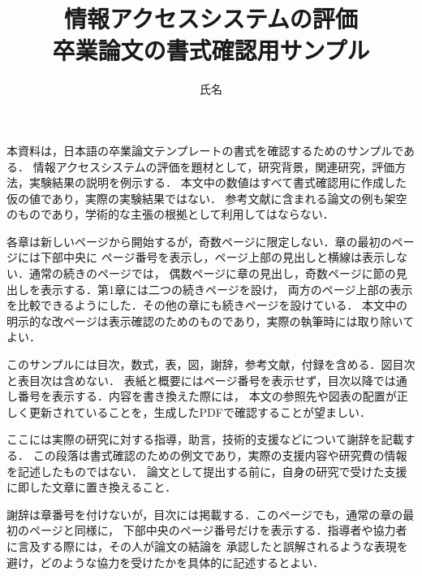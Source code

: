 \documentclass[a4paper,12pt,twoside,openany,dvipdfmx]{jsbook}
\title{情報アクセスシステムの評価\\卒業論文の書式確認用サンプル}
\affiliation{早稲田大学基幹理工学部情報理工学科}
\author{氏名}
\begin{document}
\maketitle

\begin{coverabstract}
本資料は，日本語の卒業論文テンプレートの書式を確認するためのサンプルである．
情報アクセスシステムの評価を題材として，研究背景，関連研究，評価方法，実験結果の説明を例示する．
本文中の数値はすべて書式確認用に作成した仮の値であり，実際の実験結果ではない．
参考文献に含まれる論文の例も架空のものであり，学術的な主張の根拠として利用してはならない．

各章は新しいページから開始するが，奇数ページに限定しない．章の最初のページには下部中央に
ページ番号を表示し，ページ上部の見出しと横線は表示しない．通常の続きのページでは，
偶数ページに章の見出し，奇数ページに節の見出しを表示する．第1章には二つの続きページを設け，
両方のページ上部の表示を比較できるようにした．その他の章にも続きページを設けている．
本文中の明示的な改ページは表示確認のためのものであり，実際の執筆時には取り除いてよい．

このサンプルには目次，数式，表，図，謝辞，参考文献，付録を含める．図目次と表目次は含めない．
表紙と概要にはページ番号を表示せず，目次以降では通し番号を表示する．内容を書き換えた際には，
本文の参照先や図表の配置が正しく更新されていることを，生成したPDFで確認することが望ましい．
\end{coverabstract}

\tableofcontents






\begin{acknowledgement}
ここには実際の研究に対する指導，助言，技術的支援などについて謝辞を記載する．
この段落は書式確認のための例文であり，実際の支援内容や研究費の情報を記述したものではない．
論文として提出する前に，自身の研究で受けた支援に即した文章に置き換えること．

謝辞は章番号を付けないが，目次には掲載する．このページでも，通常の章の最初のページと同様に，
下部中央のページ番号だけを表示する．指導者や協力者に言及する際には，その人が論文の結論を
承認したと誤解されるような表現を避け，どのような協力を受けたかを具体的に記述するとよい．
\end{acknowledgement}




\appendix

\end{document}
